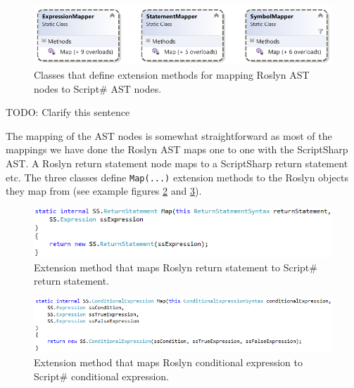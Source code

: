 		\begin{figure}[H]
			\begin{center}
				\centerline{\includegraphics[width=14cm]{resources/images/MapperClasses.png}}
			\end{center}
			\caption{Classes that define extension methods for mapping Roslyn AST nodes to Script\# AST nodes.}
			\label{mapperClasses}
		\end{figure}

		TODO: Clarify this sentence

		The mapping of the AST nodes is somewhat straightforward as most of the mappings we have done the Roslyn AST maps one to one with the ScriptSharp AST. A Roslyn return statement node maps to a ScriptSharp return statement etc. The three classes define \texttt{Map(...)} extension methods to the Roslyn objects they map from (see example figures \ref{returnStatementMap} and \ref{conditionaleExpressionMap}).

		\begin{figure}[H]
			\begin{center}
				\centerline{\includegraphics[width=14cm]{resources/images/ReturnStatementMap.png}}
			\end{center}
			\caption{Extension method that maps Roslyn return statement to Script\# return statement.}
			\label{returnStatementMap}
		\end{figure}

		\begin{figure}[H]
			\begin{center}
				\centerline{\includegraphics[width=14cm]{resources/images/ConditionalExpressionMap.png}}
			\end{center}
			\caption{Extension method that maps Roslyn conditional expression to Script\# conditional expression.}
			\label{conditionaleExpressionMap}
		\end{figure}

